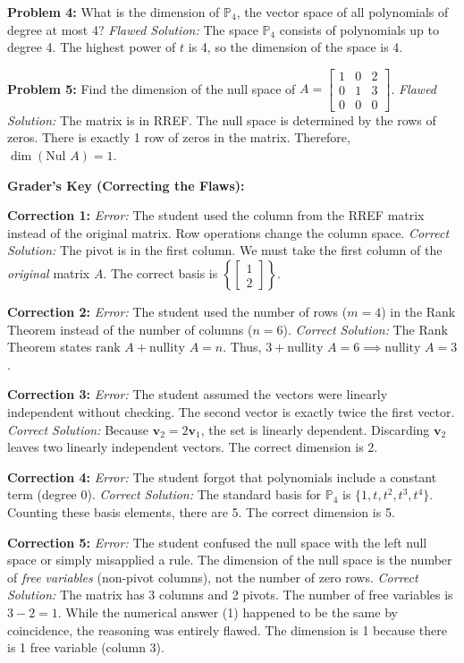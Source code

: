 \documentclass[12pt]{article}
\begin{document}
\vspace{0.5cm}
\textbf{Problem 4:} What is the dimension of $\mathbb{P}_4$, the vector space of all polynomials of degree at most 4?
\newline
\textit{Flawed Solution:} The space $\mathbb{P}_4$ consists of polynomials up to degree 4. The highest power of $t$ is 4, so the dimension of the space is 4.

\vspace{0.5cm}
\textbf{Problem 5:} Find the dimension of the null space of $A = \begin{bmatrix} 1 & 0 & 2 \\ 0 & 1 & 3 \\ 0 & 0 & 0 \end{bmatrix}$.
\newline
\textit{Flawed Solution:} The matrix is in RREF. The null space is determined by the rows of zeros. There is exactly 1 row of zeros in the matrix. Therefore, $\dim(\text{Nul } A) = 1$.

\hrulefill

\vspace{0.5cm}
\textbf{Grader's Key (Correcting the Flaws):}

\textbf{Correction 1:} 
\textit{Error:} The student used the column from the RREF matrix instead of the original matrix. Row operations change the column space.
\textit{Correct Solution:} The pivot is in the first column. We must take the first column of the \textit{original} matrix $A$. The correct basis is $\left\{ \begin{bmatrix} 1 \\ 2 \end{bmatrix} \right\}$.

\textbf{Correction 2:} 
\textit{Error:} The student used the number of rows ($m=4$) in the Rank Theorem instead of the number of columns ($n=6$).
\textit{Correct Solution:} The Rank Theorem states $\text{rank } A + \text{nullity } A = n$. Thus, $3 + \text{nullity } A = 6 \implies \text{nullity } A = 3$.

\textbf{Correction 3:} 
\textit{Error:} The student assumed the vectors were linearly independent without checking. The second vector is exactly twice the first vector.
\textit{Correct Solution:} Because $\mathbf{v}_2 = 2\mathbf{v}_1$, the set is linearly dependent. Discarding $\mathbf{v}_2$ leaves two linearly independent vectors. The correct dimension is 2.

\textbf{Correction 4:} 
\textit{Error:} The student forgot that polynomials include a constant term (degree 0).
\textit{Correct Solution:} The standard basis for $\mathbb{P}_4$ is $\{1, t, t^2, t^3, t^4\}$. Counting these basis elements, there are 5. The correct dimension is 5.

\textbf{Correction 5:} 
\textit{Error:} The student confused the null space with the left null space or simply misapplied a rule. The dimension of the null space is the number of \textit{free variables} (non-pivot columns), not the number of zero rows.
\textit{Correct Solution:} The matrix has 3 columns and 2 pivots. The number of free variables is $3 - 2 = 1$. While the numerical answer (1) happened to be the same by coincidence, the reasoning was entirely flawed. The dimension is 1 because there is 1 free variable (column 3).
\end{document}
